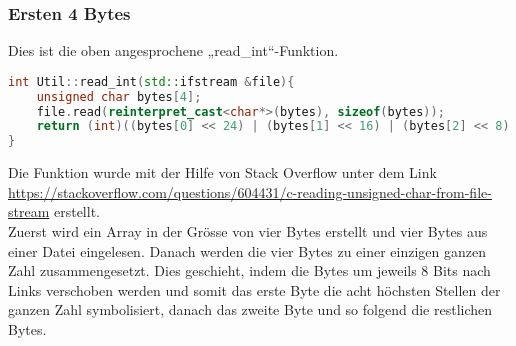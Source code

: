 \subsubsection{Ersten 4 Bytes}
\label{sec:RealErsten4BytesCode}
Dies ist die oben angesprochene „read\_int“-Funktion.
\begin{lstlisting}[language=C++]
int Util::read_int(std::ifstream &file){
    unsigned char bytes[4];
    file.read(reinterpret_cast<char*>(bytes), sizeof(bytes));
    return (int)((bytes[0] << 24) | (bytes[1] << 16) | (bytes[2] << 8) | bytes[3]);
}
\end{lstlisting}
Die Funktion wurde mit der Hilfe von Stack Overflow unter dem Link \url{https://stackoverflow.com/questions/604431/c-reading-unsigned-char-from-file-stream} erstellt.
\\
Zuerst wird ein Array in der Grösse von vier Bytes erstellt und vier Bytes aus einer Datei eingelesen. Danach werden die vier Bytes zu einer einzigen ganzen Zahl zusammengesetzt. Dies geschieht, indem die Bytes um jeweils 8 Bits nach Links verschoben werden und somit das erste Byte die acht höchsten Stellen der ganzen Zahl symbolisiert, danach das zweite Byte und so folgend die restlichen Bytes.

